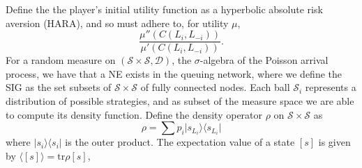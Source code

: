 \documentclass[10pt]{article}
\newcommand{\mcS}{\mathcal{S}}
\newcommand{\mcD}{\mathcal{D}}
\theoremstyle{definition}
\begin{document}
Define the the player's initial utility
function as a hyperbolic absolute risk aversion (HARA), and so must adhere to,
for utility $\mu$,
$$
    \displaystyle\frac{\mu''(C(L_i,L_{-i}))}{\mu'(C(L_i,L_{-i}))}.
$$
For a random measure on $(\mcS \times \mcS, \mcD)$, the $\sigma$-algebra of the
Poisson arrival process, we have that a NE exists in the queuing network, where we define the SIG as the set subsets of $\mcS\times\mcS$ of fully connected nodes.
Each ball $\mcS_i$ represents a distribution of possible strategies, and as subset of the
measure space we are able to compute its density function. 
Define the density operator $\rho$ on $\mcS\times \mcS$ as
$$
    \rho = \displaystyle\sum p_i\vert s_{L_i}\rangle\langle s_{L_i}\vert
$$
where $\vert s_i\rangle\langle s_i\vert$ is the outer product. The expectation
value of a state $[s]$ is given by $\langle [s] \rangle = \text{tr}{\rho [s]}$,
\end{document}
